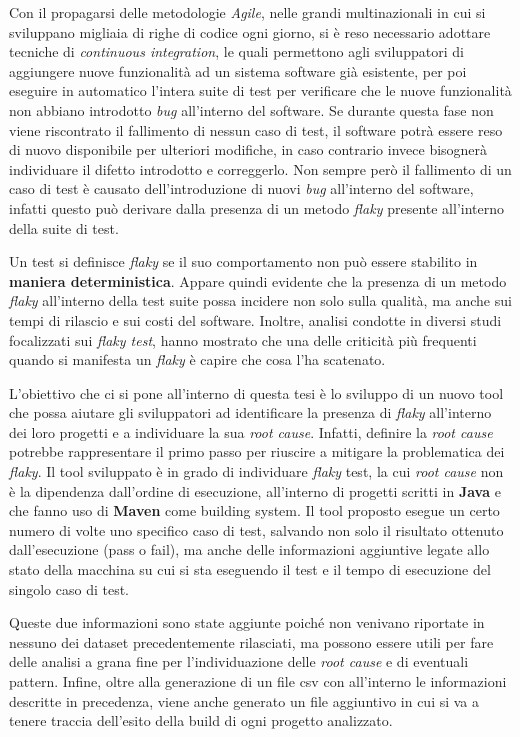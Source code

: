 Con il propagarsi delle metodologie \emph{Agile}, nelle grandi multinazionali in cui
si sviluppano migliaia di righe di codice ogni giorno, si è reso necessario adottare tecniche di \emph{continuous integration}, le quali permettono agli sviluppatori di
aggiungere nuove funzionalità ad un sistema software già esistente, per poi eseguire
in automatico l’intera suite di test per verificare che le nuove funzionalità non abbiano introdotto \emph{bug} all’interno del software. Se durante questa fase non viene riscontrato il fallimento di nessun caso di test, il software potrà essere reso di nuovo
disponibile per ulteriori modifiche, in caso contrario invece bisognerà individuare il difetto introdotto e correggerlo. Non sempre però il fallimento di un caso di test è causato dell’introduzione di nuovi \emph{bug} all’interno del software, infatti questo può
derivare dalla presenza di un metodo \emph{flaky} presente all’interno della suite di test.

Un test si definisce \emph{flaky} se il suo comportamento non può essere stabilito in \textbf{maniera deterministica}. Appare quindi evidente che la presenza di un metodo \emph{flaky}
all’interno della test suite possa incidere non solo sulla qualità, ma anche sui tempi di rilascio e sui costi del software. Inoltre, analisi condotte in diversi studi
focalizzati sui \emph{flaky test}, hanno mostrato che una delle criticità più frequenti quando si manifesta un \emph{flaky} è capire che cosa l’ha scatenato.

L’obiettivo che ci si pone all’interno di questa tesi è lo sviluppo di un nuovo tool che possa aiutare gli sviluppatori ad identificare la presenza di \emph{flaky} all’interno
dei loro progetti e a individuare la sua \emph{root cause}. Infatti, definire la \emph{root cause}
potrebbe rappresentare il primo passo per riuscire a mitigare la problematica dei
\emph{flaky}. Il tool sviluppato è in grado di individuare \emph{flaky} test, la cui \emph{root cause} non è
la dipendenza dall’ordine di esecuzione, all’interno di progetti scritti in \textbf{Java} e che fanno uso di \textbf{Maven} come building system. Il tool proposto esegue un certo numero
di volte uno specifico caso di test, salvando non solo il risultato ottenuto dall’esecuzione (pass o fail), ma anche delle informazioni aggiuntive legate allo stato della macchina su cui si sta eseguendo il test e il tempo di esecuzione del singolo caso di test.

Queste due informazioni sono state aggiunte poiché non venivano riportate in nessuno dei dataset precedentemente rilasciati, ma possono essere utili per fare delle analisi a grana fine per l'individuazione delle \emph{root cause} e di eventuali pattern.
Infine, oltre alla generazione di un file csv con all’interno le informazioni descritte in precedenza, viene anche generato un file aggiuntivo in cui si va a tenere traccia dell’esito della build di ogni progetto analizzato.

